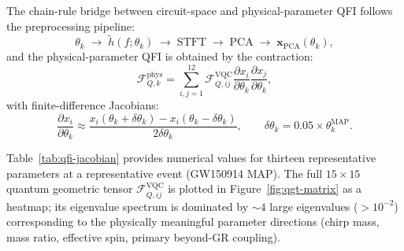 \documentclass[11pt,a4paper, english]{book}
\theoremstyle{plain}
\theoremstyle{definition}
\numberwithin{equation}{chapter}
\numberwithin{figure}{chapter}
\numberwithin{table}{chapter}
\begin{document}
The chain-rule bridge between circuit-space and physical-parameter QFI
follows the preprocessing pipeline:
\begin{equation}
  \label{eq:preprocessing_chain}
  \theta_k \; \longrightarrow \; \tilde{h}(f;\theta_k) \; \longrightarrow \;
  \text{STFT} \; \longrightarrow \; \text{PCA} \; \longrightarrow \;
  \mathbf{x}_\mathrm{PCA}(\theta_k),
\end{equation}
and the physical-parameter QFI is obtained by the contraction:
\begin{equation}
  \label{eq:qfi_physical}
  \mathcal{F}_{Q,k}^\mathrm{phys} = \sum_{i,j=1}^{12}
    \mathcal{F}_{Q,ij}^\mathrm{VQC}
    \frac{\partial x_i}{\partial \theta_k}
    \frac{\partial x_j}{\partial \theta_k},
\end{equation}
with finite-difference Jacobians:
\begin{equation}
  \label{eq:jacobian_fd}
  \frac{\partial x_i}{\partial \theta_k} \approx
    \frac{x_i(\theta_k + \delta\theta_k) - x_i(\theta_k - \delta\theta_k)}
         {2\delta\theta_k},
  \qquad \delta\theta_k = 0.05 \times \theta_k^{\mathrm{MAP}}.
\end{equation}

Table~\ref{tab:qfi-jacobian} provides numerical values for thirteen
representative parameters at a representative event (GW150914 MAP). The full
$15\times15$ quantum geometric tensor $\mathcal{F}_{Q,ij}^\mathrm{VQC}$
is plotted in Figure~\ref{fig:qgt-matrix} as a heatmap; its eigenvalue
spectrum is dominated by $\sim\!4$ large eigenvalues ($>10^{-2}$)
corresponding to the physically meaningful parameter directions (chirp
mass, mass ratio, effective spin, primary beyond-GR coupling).
\end{document}
